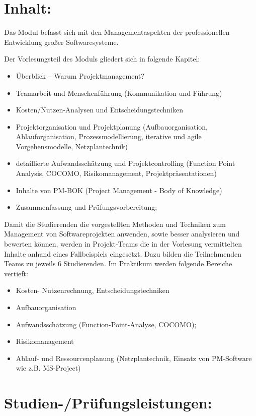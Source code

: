 \section*{Inhalt:}\label{inhalt-20}

Das Modul befasst sich mit den Managementaspekten der professionellen
Entwicklung großer Softwaresysteme.

Der Vorlesungsteil des Moduls gliedert sich in folgende Kapitel:

\begin{itemize}
\item
  Überblick -- Warum Projektmanagement?
\item
  Teamarbeit und Menschenführung (Kommunikation und Führung)
\item
  Kosten/Nutzen-Analysen und Entscheidungstechniken
\item
  Projektorganisation und Projektplanung (Aufbauorganisation,
  Ablauforganisation, Prozessmodellierung, iterative und agile
  Vorgehensmodelle, Netzplantechnik)
\item
  detaillierte Aufwandsschätzung und Projektcontrolling (Function Point
  Analysis, COCOMO, Risikomanagement, Projektpräsentationen)
\item
  Inhalte von PM-BOK (Project Management - Body of Knowledge)
\item
  Zusammenfassung und Prüfungsvorbereitung;
\end{itemize}

Damit die Studierenden die vorgestellten Methoden und Techniken zum
Management von Softwareprojekten anwenden, sowie besser analysieren und
bewerten können, werden in Projekt-Teams die in der Vorlesung
vermittelten Inhalte anhand eines Fallbeispiels eingesetzt. Dazu bilden
die Teilnehmenden Teams zu jeweils 6 Studierenden. Im Praktikum werden
folgende Bereiche vertieft:

\begin{itemize}
\item
  Kosten- Nutzenrechnung, Entscheidungstechniken
\item
  Aufbauorganisation
\item
  Aufwandsschätzung (Function-Point-Analyse, COCOMO);
\item
  Risikomanagement
\item
  Ablauf- und Ressourcenplanung (Netzplantechnik, Einsatz von
  PM-Software wie z.B. MS-Project)
\end{itemize}

\section*{Studien-/Prüfungsleistungen:}\label{studien-pruxfcfungsleistungen-18}

